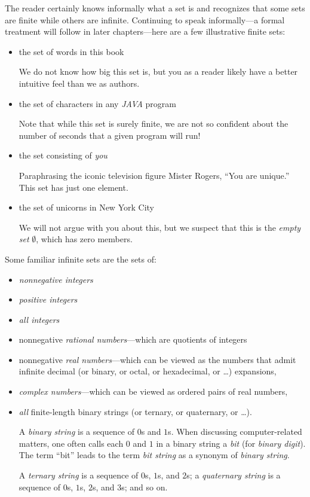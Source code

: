 The reader certainly knows informally what a set is and recognizes that some sets are finite while others are infinite.  Continuing to speak informally---a formal treatment will follow in later
chapters---here are a few illustrative finite sets:
\begin{itemize}
\item
the set of words in this book

\smallskip

We do not know how big this set is, but you as a reader likely have a better intuitive feel than we as authors.
\medskip\item
the set of characters in any {\it JAVA} program

\smallskip

Note that while this set is surely finite, we are not so confident about the number of seconds that a given program will run!
\medskip\item
the set consisting of {\em you}

\smallskip

Paraphrasing the iconic television figure Mister Rogers, ``You are unique.''  This set has just one element.
\medskip\item
the set of unicorns in New York City

\smallskip

We will not argue with you about this, but we suspect that this is the {\em empty set} $\emptyset$, which has zero members.
\end{itemize}
Some familiar infinite sets are the sets of:
\begin{itemize}
\item
{\em nonnegative integers}
\medskip\item
{\em positive integers}
\medskip\item
{\em all integers}
\medskip\item
nonnegative {\em rational numbers}---which are quotients of integers
\medskip\item
nonnegative {\em real numbers}---which can be viewed as the numbers that admit infinite decimal (or binary, or octal, or hexadecimal, or \ldots) expansions,
\medskip\item
{\em complex numbers}---which can be viewed as ordered pairs of real numbers,
\medskip\item
{\em all} finite-length binary strings (or ternary, or quaternary, or \ldots).

\smallskip

  
A {\it binary string} is a sequence of $0$s and $1$s.  When discussing computer-related matters, one often calls each $0$ and $1$ in a binary string a {\it bit} (for {\it binary digit}).  The term ``bit'' leads to the term {\it bit string} as a synonym of {\it binary string}.

  
A {\it ternary string} is a sequence of $0$s, $1$s, and $2$s; a {\it quaternary string} is a sequence of $0$s, $1$s, $2$s, and $3$s; and so on.
\end{itemize}
